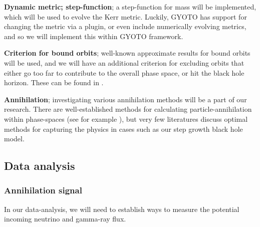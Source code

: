 \documentclass[12pt]{article}
\begin{document}
\textbf{Dynamic metric; step-function}; a step-function for mass will be implemented, which will be used to evolve the Kerr metric. 
Luckily, GYOTO has support for changing the metric via a plugin, or even include numerically evolving metrics, and so we will 
implement this within GYOTO framework.

\textbf{Criterion for bound orbits}; well-known approximate results for bound orbits will be used, and we will have an additional criterion 
for excluding orbits that either go too far to contribute to the overall phase space, or hit the black hole horizon. These can be found in 
\citep{Sadeghian_Ferrer_Will_2013, schnittman2015}.

\textbf{Annihilation}; investigating various annihilation methods will be a part of our research. 
There are well-established methods for calculating 
particle-annihilation within phase-spaces (see for example \citep{boltzmann_dm_annihilation}), 
but very few literatures discuss optimal methods for capturing the physics in cases such as 
our step growth black hole model.




\subsection{Data analysis}


\subsubsection{Annihilation signal}

In our data-analysis, we will need to establish ways to measure the potential incoming neutrino and gamma-ray flux.
\end{document}
